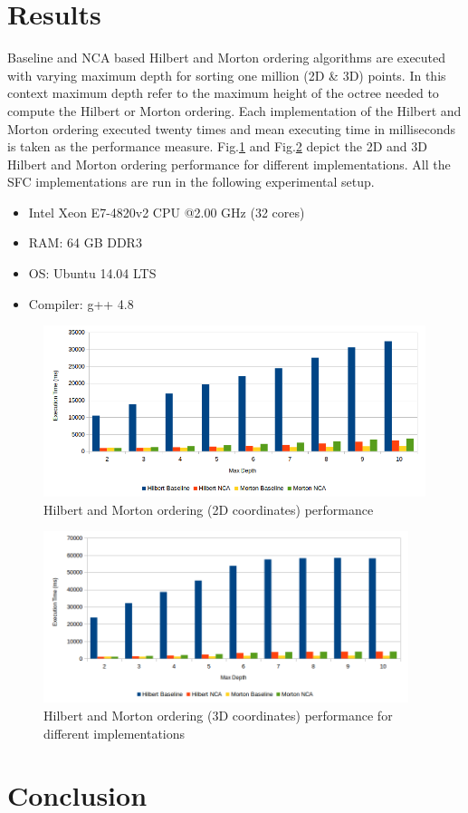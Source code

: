 \documentclass[a4paper,10pt]{article}
\begin{document}
\section{Results}

Baseline and NCA based Hilbert and Morton ordering algorithms are executed with varying maximum depth for sorting one million (2D \& 3D) points. In this context maximum depth refer to the maximum height of the
octree needed to compute the Hilbert or Morton ordering. Each implementation of the Hilbert and Morton ordering executed twenty times and mean executing time in milliseconds is taken as the performance measure.
Fig.\ref{2d} and Fig.\ref{3d} depict the 2D and 3D Hilbert and Morton ordering performance for different implementations. All the SFC implementations are run in the following experimental setup.

\begin{itemize}
 \item Intel Xeon E7-4820v2 CPU @2.00 GHz (32 cores)
 \item RAM: 64 GB DDR3
 \item OS: Ubuntu 14.04 LTS
 \item Compiler: g++ 4.8
\end{itemize}


\begin{figure}[H]
\centering
\includegraphics[height=50mm,keepaspectratio]{images/2d.png}
\caption{Hilbert and Morton ordering (2D coordinates) performance \label{2d}}
\end{figure}

\begin{figure}[H]
\centering
\includegraphics[height=50mm,keepaspectratio]{images/3d.png}
\caption{Hilbert and Morton ordering (3D coordinates) performance for different implementations \label{3d}}
\end{figure}


\section{Conclusion}
\end{document}
